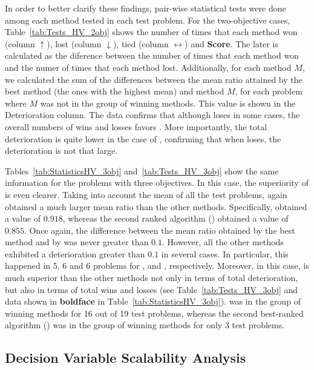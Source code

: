 In order to better clarify these findings, pair-wise statistical tests were done among each method tested in each
test problem.
%
For the two-objective cases, Table~\ref{tab:Tests_HV_2obj} shows the number of times that each method won (column $\uparrow$),
lost (column $\downarrow$), tied (column $\leftrightarrow$) and \textbf{Score}.
%
The later is calculated as the diference between the number of times that each method won and the numer of times that each method lost.
%
Additionally, for each method $M$, we calculated the sum of the differences between the mean \HV{} ratio attained by the best method 
(the ones with the highest mean) and method $M$, for each problem where $M$ was not in the group of winning methods.
%
This value is shown in the Deterioration column.
%
The data confirms that although \VSDMOEA{} loses in some cases, the overall numbers of wins and losses
favors \VSDMOEA{}.
%
More importantly, the total deterioration is quite lower in the case of \VSDMOEA{}, confirming that when \VSDMOEA{} loses, the deterioration is not 
that large.




Tables~\ref{tab:StatisticsHV_3obj} and~\ref{tab:Tests_HV_3obj} show the same information for the problems with three objectives.
%
In this case, the superiority of \VSDMOEA{} is even clearer.
%
Taking into account the mean of all the test problems, \VSDMOEA{} again obtained a much larger mean \HV{} ratio than the other methods.
%
Specifically, \VSDMOEA{} obtained a value of $0.918$, whereas the second ranked algorithm (\RMOEA{}) obtained a value of $0.855$.
%
Once again, the difference between the mean \HV{} ratio obtained by the best method and by \VSDMOEA{} was never greater
than $0.1$.
%
However, all the other methods exhibited a deterioration greater than $0.1$ in several cases.
%
In particular, this happened in $5$, $6$ and $6$ problems for \RMOEA{}, \NSGAII{} and \MOEAD{}, respectively.
%
Moreover, in this case, \VSDMOEA{} is much superior than the other methods not only in terms of total deterioration, but also
in terms of total wins and losses (see Table~\ref{tab:Tests_HV_3obj} and data shown in {\bf boldface} 
in Table~\ref{tab:StatisticsHV_3obj}).
%
\VSDMOEA{} was in the group of winning methods for 16 out of 19 test problems, whereas the second best-ranked algorithm (\RMOEA{})
was in the group of winning methods for only 3 test problems.

\subsection{Decision Variable Scalability Analysis}

